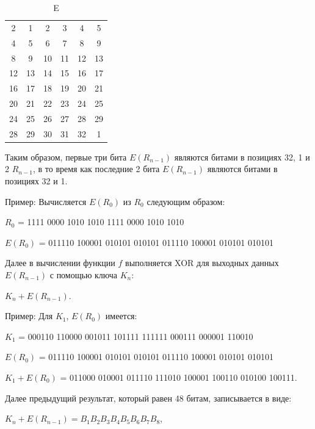 \begin{table}[ht!]
    \begin{center}
	\captionsetup{justification=raggedright,singlelinecheck=off}
	\caption{\label{tbl:e} E}
        \begin{tabular}{ |c c c c c c|}
                2  &   1   &  2   &   3   &   4   &  5 \\
                  4   &   5  &   6   &   7     & 8  &   9 \\
                  8    &  9   & 10    & 11   &  12   & 13 \\
                 12   &  13  &  14  &   15   &  16  &  17 \\
                 16   &  17  &  18  &   19   &  20  &  21 \\
                 20   &  21  &  22  &   23  &   24  &  25 \\
                 24   &  25  &  26  &   27  &   28  &  29 \\
                 28   &  29  &  30  &   31   &  32  &   1 \\
        \end{tabular}
    \end{center}
\end{table}

Таким образом, первые три бита $E(R_{n-1})$ являются битами в позициях 32, 1 и 2 $R_{n-1}$, в то время как последние 2 бита $E(R_{n-1})$ являются битами в позициях 32 и 1.

Пример: Вычисляется $E(R_0)$ из $R_0$ следующим образом:

$R_0$ = 1111 0000 1010 1010 1111 0000 1010 1010

$E(R_0)$ = 011110 100001 010101 010101 011110 100001 010101 010101

Далее в вычислении функции $f$ выполняется XOR для выходных данных $E(R_{n-1})$ с помощью ключа $K_n$:

$K_n + E(R_{n-1})$.

Пример: Для $K_1$, $E(R_0)$ имеется:

$K_1$ = 000110 110000 001011 101111 111111 000111 000001 110010

$E(R_0)$ = 011110 100001 010101 010101 011110 100001 010101 010101

$K_1+E(R_0)$ = 011000 010001 011110 111010 100001 100110 010100 100111.

Далее предыдущий результат, который равен 48 битам, записывается в виде:

$K_n + E(R_{n-1}) = B_1 B_2 B_3 B_4 B_5 B_6 B_7 B_8$,

